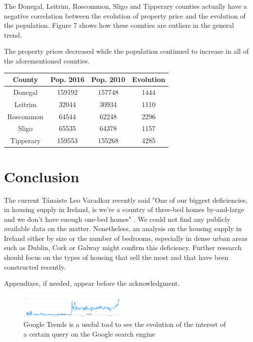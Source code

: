 \documentclass[twocolumn]{article}
\begin{document}
The Donegal, Leitrim, Roscommon, Sligo and Tipperary counties actually have a negative correlation between the evolution of property price and the evolution of the population. Figure 7 shows how these counties are outliers in the general trend.

The property prices decreased while the population continued to increase in all of the aforementioned counties.

\begin{center}
\begin{tabular}{||c c c c||}
 \hline
 County & Pop. 2016 & Pop. 2010 & Evolution \\ [0.5ex]
 \hline\hline
 Donegal & 159192 & 157748 & 1444 \\
 \hline
 Leitrim & 32044 & 30934 & 1110 \\
 \hline
 Roscommon & 64544 & 62248 & 2296 \\
 \hline
 Sligo & 65535 & 64378 & 1157 \\
 \hline
 Tipperary & 159553 & 155268 & 4285 \\ [1ex]
 \hline
\end{tabular}
\end{center}

\section{Conclusion}
The current Tánaiste Leo Varadkar recently said "One of our biggest deficiencies, in housing supply in Ireland, is we're a country of three-bed homes by-and-large and we don't have enough one-bed homes" \cite{mcgrath21}. We could not find any publicly available data on the matter. Nonetheless, an analysis on the housing supply in Ireland either by size or the number of bedrooms, especially in dense urban areas such as Dublin, Cork or Galway might confirm this deficiency. Further research should focus on the types of housing that sell the most and that have been constructed recently.

Appendixes, if needed, appear before the acknowledgment.



\raggedright

\onecolumn
\appendices
\begin{figure}[h]
	\centering
	\includegraphics[width=0.47\textwidth]{media/google_trend_property_price.png}
	\caption{Google Trends is a useful tool to see the evolution of the interest of a certain query on the Google search engine}
	\label{fig1}
\end{figure}
\end{document}
